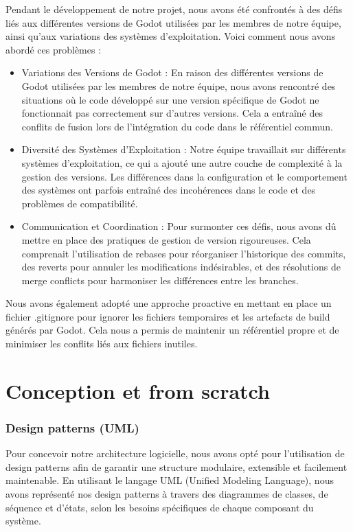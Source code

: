 \documentclass[
	article,			%
	11pt,				%
	oneside,			%
	a4paper,			%
	chapter=TITLE,
	french,			%
	sumario=tradicional
	]{base_nt}
\begin{document}
Pendant le développement de notre projet, nous avons été confrontés à des défis liés aux différentes versions de Godot utilisées par les membres de notre équipe, ainsi qu'aux variations des systèmes d'exploitation. Voici comment nous avons abordé ces problèmes :

\begin{itemize}
    \item Variations des Versions de Godot : En raison des différentes versions de Godot utilisées par les membres de notre équipe, nous avons rencontré des situations où le code développé sur une version spécifique de Godot ne fonctionnait pas correctement sur d'autres versions. Cela a entraîné des conflits de fusion lors de l'intégration du code dans le référentiel commun.
    \item Diversité des Systèmes d'Exploitation : Notre équipe travaillait sur différents systèmes d'exploitation, ce qui a ajouté une autre couche de complexité à la gestion des versions. Les différences dans la configuration et le comportement des systèmes ont parfois entraîné des incohérences dans le code et des problèmes de compatibilité.
    \item Communication et Coordination : Pour surmonter ces défis, nous avons dû mettre en place des pratiques de gestion de version rigoureuses. Cela comprenait l'utilisation de rebases pour réorganiser l'historique des commits, des reverts pour annuler les modifications indésirables, et des résolutions de merge conflicts pour harmoniser les différences entre les branches.
\end{itemize}

Nous avons également adopté une approche proactive en mettant en place un fichier .gitignore pour ignorer les fichiers temporaires et les artefacts de build générés par Godot. Cela nous a permis de maintenir un référentiel propre et de minimiser les conflits liés aux fichiers inutiles.

\part{Conception et from scratch}

\section{Design patterns (UML)}

Pour concevoir notre architecture logicielle, nous avons opté pour l'utilisation de design patterns afin de garantir une structure modulaire, extensible et facilement maintenable. En utilisant le langage UML (Unified Modeling Language), nous avons représenté nos design patterns à travers des diagrammes de classes, de séquence et d'états, selon les besoins spécifiques de chaque composant du système.
\end{document}
